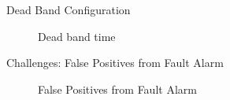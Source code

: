 \begin{frame}{Dead Band Configuration}
	\begin{figure}
		\centering

		\caption{Dead band time}
	\end{figure}
\end{frame}





\begin{frame}{Challenges: False Positives from Fault Alarm}

	\begin{figure}
		\centering
		\caption{False Positives from Fault Alarm}
	\end{figure}
\end{frame}

